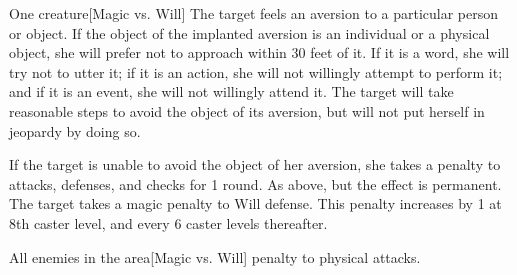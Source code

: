 \begin{spellheader}
    \spellrng{\rngmed}
\end{spellheader}
\begin{spelleffects}
    \begin{spelltarget}{One creature}[Magic vs. Will]
        \spellsuccess The target feels an aversion to a particular person or object. If the object of the implanted aversion is an individual or a physical object, she will prefer not to approach within 30 feet of it. If it is a word, she will try not to utter it; if it is an action, she will not willingly attempt to perform it; and if it is an event, she will not willingly attend it. The target will take reasonable steps to avoid the object of its aversion, but will not put herself in jeopardy by doing so.
        \par If the target is unable to avoid the object of her aversion, she takes a  penalty to attacks, defenses, and checks for 1 round.
        \spellcritical As above, but the effect is permanent.
        \spellfailure The target takes a  magic penalty to Will defense. This penalty increases by 1 at 8th caster level, and every 6 caster levels thereafter.
    \end{spelltarget}
\end{spelleffects}
\begin{spellfooter}
    
\end{spellfooter}

\begin{comment}
\subsubsection{B}
\end{comment}

\begin{spellheader}
\end{spellheader}
\begin{spelleffects}
    \begin{spelltargets}{All enemies in the area}[Magic vs. Will]
        \spellsuccess {} penalty to physical attacks.
    \end{spelltargets}
\end{spelleffects}
\begin{spellfooter}
    
\end{spellfooter}

